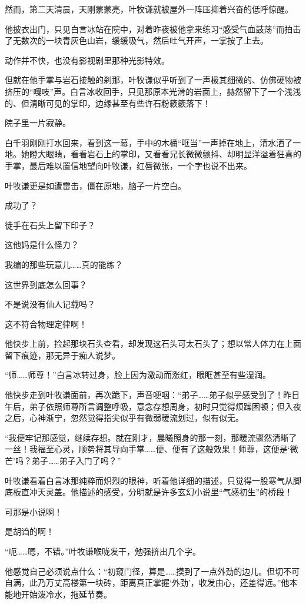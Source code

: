 然而，第二天清晨，天刚蒙蒙亮，叶牧谦就被屋外一阵压抑着兴奋的低呼惊醒。

他披衣出门，只见白言冰站在院中，对着昨夜被他拿来练习“感受气血鼓荡”而拍击了无数次的一块青灰色山岩，缓缓吸气，然后吐气开声，一掌按了上去。

动作并不快，也没有影视剧里那种光影特效。

但就在他手掌与岩石接触的刹那，叶牧谦似乎听到了一声极其细微的、仿佛硬物被挤压的“嘎吱”声。白言冰收回手，只见那原本光滑的岩面上，赫然留下了一个浅浅的、但清晰可见的掌印，边缘甚至有些许石粉簌簌落下！

院子里一片寂静。

白千羽刚刚打水回来，看到这一幕，手中的木桶“哐当”一声掉在地上，清水洒了一地。她瞪大眼睛，看看岩石上的掌印，又看看兄长微微颤抖、却明显洋溢着狂喜的手掌，最后难以置信地望向叶牧谦，红唇微张，一个字也说不出来。

叶牧谦更是如遭雷击，僵在原地，脑子一片空白。

成功了？

徒手在石头上留下印子？

这他妈是什么怪力？

我编的那些玩意儿……真的能练？

这世界到底怎么回事？

不是说没有仙人记载吗？

这不符合物理定律啊！

他快步上前，捡起那块石头查看，却发现这石头可太石头了；想以常人体力在上面留下痕迹，那无异于痴人说梦。

“师……师尊！”白言冰转过身，脸上因为激动而涨红，眼眶甚至有些湿润。

他快步走到叶牧谦面前，再次跪下，声音哽咽：“弟子……弟子似乎感受到了！昨日午后，弟子依照师尊所言调整呼吸，意念存想周身，初时只觉得烦躁困顿；但入夜之后，心神渐宁，忽然觉得指尖似乎有微弱暖流划过，似有似无。

“我便牢记那感觉，继续存想。就在刚才，晨曦照身的那一刻，那暖流骤然清晰了一丝！我福至心灵，顺势将其导向手掌……便、便有了这般效果！师尊，这便是‘微芒’吗？弟子……弟子入门了吗？”

叶牧谦看着白言冰那纯粹而炽烈的眼神，听着他详细的描述，只觉得一股寒气从脚底板直冲天灵盖。他描述的感受，分明就是许多玄幻小说里“气感初生”的桥段！

可那是小说啊！

是胡诌的啊！

“呃……嗯，不错。”叶牧谦喉咙发干，勉强挤出几个字。

他感觉自己必须说点什么：“初窥门径，算是……摸到了一点外劲的边儿。但切不可自满，此乃万丈高楼第一块砖，距离真正掌握‘外劲’，收发由心，还差得远。”他本能地开始泼冷水，拖延节奏。

